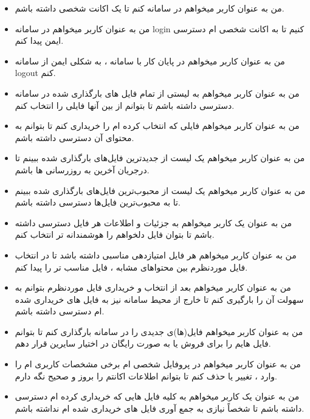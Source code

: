 \documentclass{article}
\begin{document}
\begin{itemize}
	\item من به عنوان کاربر میخواهم در سامانه  کنم تا یک اکانت شخصی داشته باشم.
	
	\item من به عنوان کاربر میخواهم در سامانه login کنیم تا به اکانت شخصی ام دسترسی ایمن پیدا کنم.
	
	\item من به عنوان کاربر میخواهم در پایان کار با سامانه ، به شکلی ایمن از سامانه logout کنم.
	
	\item من به عنوان کاربر میخواهم به لیستی از تمام فایل های بارگذاری شده در سامانه دسترسی داشته باشم تا بتوانم از بین آنها فایلی را انتخاب کنم.
	
	\item من به عنوان کاربر میخواهم فایلی که انتخاب کرده ام را خریداری کنم تا بتوانم به محتوای آن دسترسی داشته باشم.
	
	\item من به عنوان کاربر میخواهم یک لیست از جدیدترین فایل‌های بارگذاری شده ببینم تا درجریان آخرین به روزرسانی ها باشم.
	
	\item من به عنوان کاربر میخواهم یک لیست از محبوب‌ترین فایل‌های بارگذاری شده ببینم تا به محبوب‌ترین‌ فایل‌ها دسترسی داشته باشم.
	
	\item من به عنوان یک کاربر میخواهم به جزئیات و اطلاعات هر فایل دسترسی داشته باشم تا بتوان فایل دلخواهم را هوشمندانه تر انتخاب کنم.
		
	\item من به عنوان کاربر میخواهم هر فایل امتیازدهی مناسبی داشته باشد تا در انتخاب فایل موردنظرم بین محتواهای مشابه ، فایل مناسب تر را پیدا کنم.
	
	\item من به عنوان کاربر میخواهم بعد از انتخاب و خریداری فایل موردنظرم بتوانم به سهولت آن را بارگیری کنم تا خارج از محیط سامانه نیز به فایل های خریداری شده ام دسترسی داشته باشم.
	
	\item من به عنوان کاربر میخواهم فایل(ها)ی جدیدی را در سامانه بارگذاری کنم تا بتوانم فایل هایم را برای فروش یا به صورت رایگان در اختیار سایرین قرار دهم.
	
	\item من به عنوان کاربر میخواهم در پروفایل شخصی ام برخی مشخصات کاربری ام را وارد ، تغییر یا حذف کنم تا بتوانم اطلاعات اکانتم را بروز و صحیح نگه دارم. 
	
	\item من به عنوان یک کاربر میخواهم به کلیه فایل هایی که خریداری کرده ام دسترسی داشته باشم تا شخصاً نیازی به جمع آوری فایل های خریداری شده ام نداشته باشم.
	

\end{itemize}
\end{document}
